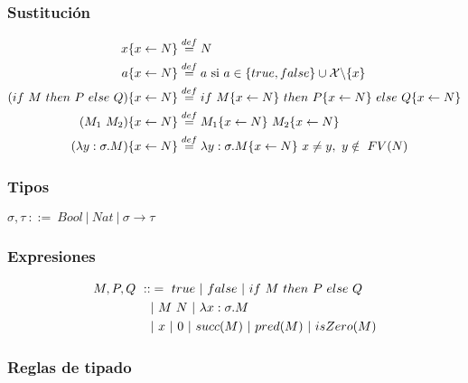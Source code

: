 \documentclass[10pt,a4paper]{article}
\begin{document}
\subsubsection*{Sustitución}
\begin{equation*}
\begin{split}
x\{x\leftarrow N\} &\overset{def}{=} N \\
a\{x\leftarrow N\} &\overset{def}{=} a \text{ si } a \in \{true,false\}\cup\mathcal{X}\backslash\{x\} \\
(if~ M~ then~ P~ else~ Q)\{x\leftarrow N\} &\overset{def}{=} if~ M\{x\leftarrow N\}~ then~ P\{x\leftarrow N\}~ else~ Q\{x\leftarrow N\}\\
(M_1~M_2)\{x\leftarrow N\} &\overset{def}{=} M_1\{x\leftarrow N\}~M_2\{x\leftarrow N\}\\
(\lambda y: \sigma . M)\{x\leftarrow N\} &\overset{def}{=} \lambda y: \sigma . M\{x\leftarrow N\}~x\neq y,~y\notin~FV(N)
\end{split}
\end{equation*}

\subsubsection{Tipos}
$\sigma, \tau ~::=~ Bool~|~Nat~|~\sigma\to\tau$
\subsubsection*{Expresiones}
\begin{equation}
\begin{split}
M, P, Q ~ ::&= ~ true~|~ false~|~ if~ M~ then~ P~ else~ Q \\
&|~ M~N~|~ \lambda x: \sigma . M \\
&|~x~|~0~|~succ(M)~|~pred(M)~|~isZero(M)
\end{split}
\end{equation}




\subsubsection{Reglas de tipado}
\end{document}
